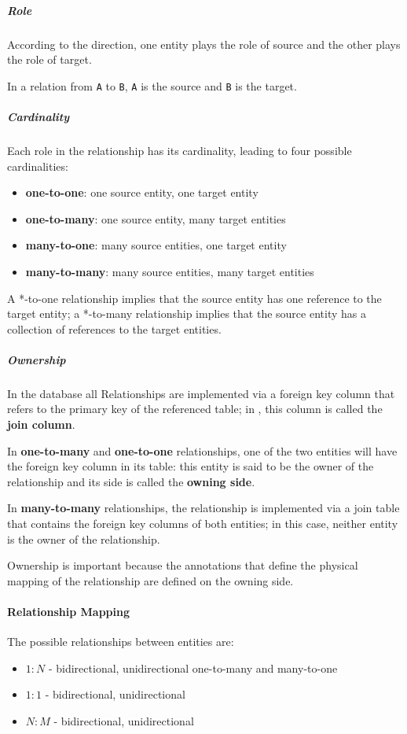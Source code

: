 \documentclass[english]{article}
\begin{document}
\subparagraph*{Role}
According to the direction, one entity plays the role of source and the other plays the role of target.

In a relation from \texttt{A} to \texttt{B}, \texttt{A} is the source and \texttt{B} is the target.

\subparagraph*{Cardinality}
Each role in the relationship has its cardinality, leading to four possible cardinalities:

\begin{itemize}
  \item \textbf{one-to-one}: one source entity, one target entity
  \item \textbf{one-to-many}: one source entity, many target entities
  \item \textbf{many-to-one}: many source entities, one target entity
  \item \textbf{many-to-many}: many source entities, many target entities
\end{itemize}

A *-to-one relationship implies that the source entity has one reference to the target entity;
a *-to-many relationship implies that the source entity has a collection of references to the target entities.

\subparagraph*{Ownership}
In the database all Relationships are implemented via a foreign key column that refers to the primary key of the referenced table;
in \jpa, this column is called the \textbf{join column}.

In \textbf{one-to-many} and \textbf{one-to-one} relationships, one of the two entities will have the foreign key column in its table:
this entity is said to be the owner of the relationship and its side is called the \textbf{owning side}.

In \textbf{many-to-many} relationships, the relationship is implemented via a join table that contains the foreign key columns of both entities;
in this case, neither entity is the owner of the relationship.

Ownership is important because the annotations that define the physical mapping of the relationship are defined on the owning side.

\paragraph{Relationship Mapping}

The possible relationships between entities are:

\begin{itemize}
  \item \(1:N\) - bidirectional, unidirectional one-to-many and many-to-one
  \item \(1:1\) - bidirectional, unidirectional
  \item \(N:M\) - bidirectional, unidirectional
\end{itemize}
\end{document}
